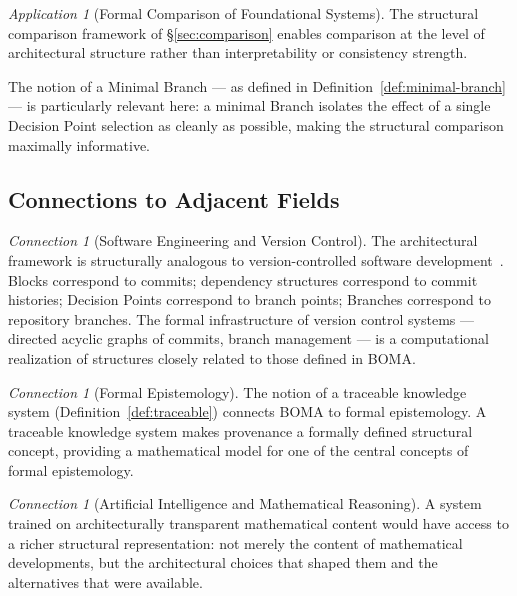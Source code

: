 \documentclass[12pt, a4paper]{article}
\theoremstyle{plain}
\theoremstyle{definition}
\theoremstyle{remark}
\newtheorem{application}[theorem]{Application}
\newtheorem{connection}[theorem]{Connection}
\newcommand{\BOMA}{\textsf{BOMA}}
\begin{document}
\begin{application}[Formal Comparison of Foundational Systems]
\label{app:formal-comparison}
The structural comparison framework of \S\ref{sec:comparison} enables
comparison at the level of architectural structure rather than
interpretability or consistency strength.

The notion of a Minimal Branch --- as defined in
Definition~\ref{def:minimal-branch} --- is particularly relevant here:
a minimal Branch isolates the effect of a single Decision Point
selection as cleanly as possible, making the structural comparison
maximally informative.
\end{application}

\subsection{Connections to Adjacent Fields}
\label{subsec:adjacent}

\begin{connection}[Software Engineering and Version Control]
\label{con:version-control}
The architectural framework is structurally analogous to
version-controlled software development~\cite{Coq2023,deMouraEtAl2015}.
Blocks correspond to commits; dependency structures correspond to
commit histories; Decision Points correspond to branch points; Branches
correspond to repository branches. The formal infrastructure of
version control systems --- directed acyclic graphs of commits, branch
management --- is a computational realization of structures closely
related to those defined in \BOMA{}.
\end{connection}

\begin{connection}[Formal Epistemology]
\label{con:epistemology}
The notion of a traceable knowledge system (Definition~\ref{def:traceable})
connects \BOMA{} to formal epistemology. A traceable knowledge system
makes provenance a formally defined structural concept, providing a
mathematical model for one of the central concepts of formal epistemology.
\end{connection}

\begin{connection}[Artificial Intelligence and Mathematical Reasoning]
\label{con:ai}
A system trained on architecturally transparent mathematical content
would have access to a richer structural representation: not merely
the content of mathematical developments, but the architectural choices
that shaped them and the alternatives that were available.
\end{connection}
\end{document}
